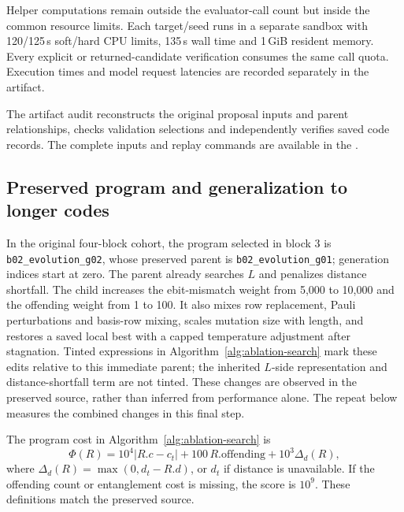 Helper computations remain outside the evaluator-call count but inside
the common resource limits. Each target/seed runs in a separate sandbox
with 120/125\,s soft/hard CPU limits, 135\,s wall time and 1\,GiB resident
memory. Every explicit or returned-candidate verification consumes the
same call quota. Execution times and model request latencies are
recorded separately in the artifact.

The artifact audit reconstructs the original proposal inputs and parent
relationships, checks validation selections and independently verifies
saved code records. The complete inputs and replay commands are available
in the \artifactlink{}.



\subsection{Preserved program and generalization to longer codes}\label{app:hitl-program}
In the original four-block cohort, the program selected in block 3 is
\texttt{b02\_evolution\_g02}, whose preserved parent is
\texttt{b02\_evolution\_g01}; generation indices start at zero.
The parent already searches $L$ and penalizes distance shortfall.
The child increases the ebit-mismatch weight from 5,000 to 10,000 and
the offending weight from 1 to 100. It also mixes row replacement,
Pauli perturbations and basis-row mixing, scales mutation size with
length, and restores a saved local best with a capped temperature
adjustment after stagnation. Tinted expressions in Algorithm~\ref{alg:ablation-search} mark these edits
relative to this immediate parent; the inherited $L$-side representation
and distance-shortfall term are not tinted. These changes are observed
in the preserved source, rather than inferred from performance alone. The repeat below measures the combined changes in this final step.



The program cost in Algorithm~\ref{alg:ablation-search} is
\[
 \Phi(R)=10^4|R.c-c_t|+100\,R.\mathrm{offending}+10^3\Delta_d(R),
\]
where $\Delta_d(R)=\max(0,d_t-R.d)$, or $d_t$ if distance is unavailable.
If the offending count or entanglement cost is missing, the score is
$10^9$. These definitions match the preserved source.

